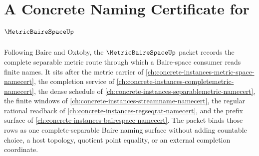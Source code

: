 \chapter{A Concrete Naming Certificate for $\MetricBaireSpaceUp$}
\label{ch:concrete-instances-metric-baire-space-namecert}

Following Baire and Oxtoby, the $\MetricBaireSpaceUp$ packet records the
complete separable metric route through which a Baire-space consumer reads
finite names. It sits after the metric carrier of
\autoref{ch:concrete-instances-metric-space-namecert}, the completion service
of \autoref{ch:concrete-instances-completemetric-namecert}, the dense schedule
of \autoref{ch:concrete-instances-separablemetric-namecert}, the finite
windows of \autoref{ch:concrete-instances-streamname-namecert}, the regular
rational readback of \autoref{ch:concrete-instances-regseqrat-namecert}, and
the prefix surface of \autoref{ch:concrete-instances-bairespace-namecert}.
The packet binds those rows as one complete-separable Baire naming surface
without adding countable choice, a host topology, quotient point equality, or
an external completion coordinate.

